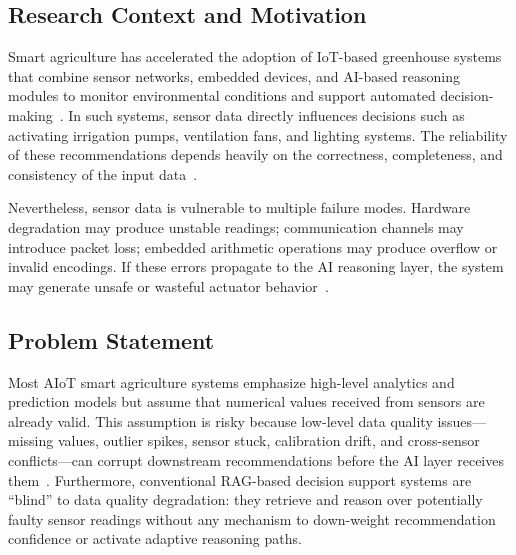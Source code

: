 \documentclass[runningheads]{llncs}
\begin{document}
\subsection{Research Context and Motivation}
Smart agriculture has accelerated the adoption of IoT-based greenhouse systems that combine sensor networks, embedded devices, and AI-based reasoning modules to monitor environmental conditions and support automated decision-making~\cite{dalhatu2023aiot}. In such systems, sensor data directly influences decisions such as activating irrigation pumps, ventilation fans, and lighting systems. The reliability of these recommendations depends heavily on the correctness, completeness, and consistency of the input data~\cite{zhang2023dq}.

Nevertheless, sensor data is vulnerable to multiple failure modes. Hardware degradation may produce unstable readings; communication channels may introduce packet loss; embedded arithmetic operations may produce overflow or invalid encodings. If these errors propagate to the AI reasoning layer, the system may generate unsafe or wasteful actuator behavior~\cite{shekarian2024sensor}.

\subsection{Problem Statement}
Most AIoT smart agriculture systems emphasize high-level analytics and prediction models but assume that numerical values received from sensors are already valid. This assumption is risky because low-level data quality issues---missing values, outlier spikes, sensor stuck, calibration drift, and cross-sensor conflicts---can corrupt downstream recommendations before the AI layer receives them~\cite{fizza2021evaluating}. Furthermore, conventional RAG-based decision support systems are ``blind'' to data quality degradation: they retrieve and reason over potentially faulty sensor readings without any mechanism to down-weight recommendation confidence or activate adaptive reasoning paths.
\end{document}
